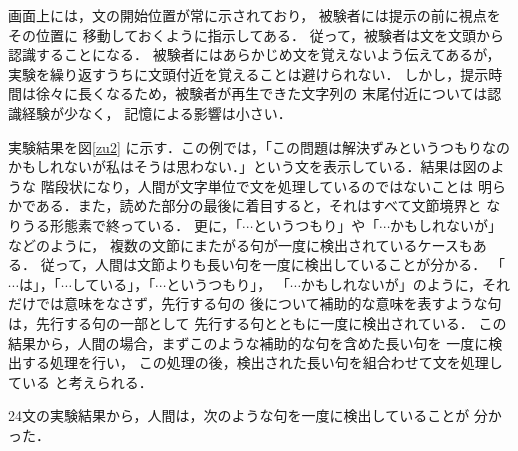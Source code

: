 画面上には，文の開始位置が常に示されており，
被験者には提示の前に視点をその位置に
移動しておくように指示してある．
従って，被験者は文を文頭から認識することになる．
被験者にはあらかじめ文を覚えないよう伝えてあるが，
実験を繰り返すうちに文頭付近を覚えることは避けられない．
しかし，提示時間は徐々に長くなるため，被験者が再生できた文字列の
末尾付近については認識経験が少なく，
記憶による影響は小さい．

実験結果を図\ref{zu2} に示す．\hspace*{-2mm}この例では，\hspace*{-2mm}「この問題は解決ずみというつもりなの
かもしれないが私はそうは思わない．」という文を表示している．結果は図のような
階段状になり，人間が文字単位で文を処理しているのではないことは
明らかである．また，読めた部分の最後に着目すると，それはすべて文節境界と
なりうる形態素で終っている．
更に，「$\cdots$というつもり」\hspace*{-1mm}や\hspace*{-1mm}「$\cdots$かもしれないが」などのように，
複数の文節にまたがる句が一度に検出されているケースもある．
従って，人間は文節よりも長い句を一度に検出していることが分かる．
「$\cdots$は」，「$\cdots$している」，「$\cdots$というつもり」，
「$\cdots$かもしれないが」のように，それだけでは意味をなさず，先行する句の
後について補助的な意味を表すような句は，先行する句の一部として
先行する句とともに一度に検出されている．
この結果から，人間の場合，まずこのような補助的な句を含めた長い句を
一度に検出する処理を行い，
この処理の後，検出された長い句を組合わせて文を処理している
と考えられる．

24文の実験結果から，人間は，次のような句を一度に検出していることが
分かった．

